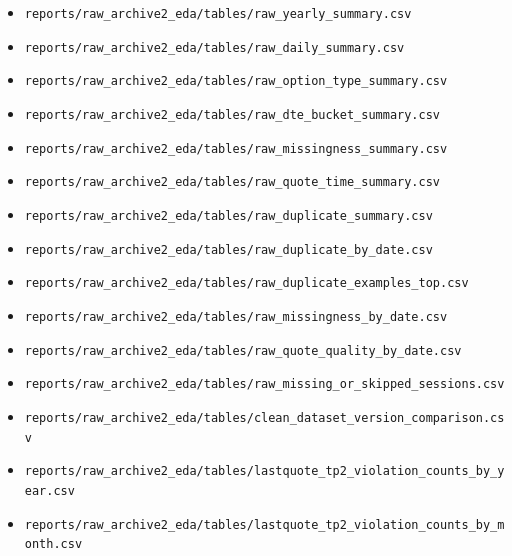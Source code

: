 \documentclass[11pt]{article}
\begin{document}
\begin{itemize}
  \item \texttt{reports/raw\_archive2\_eda/tables/raw\_yearly\_summary.csv}
  \item \texttt{reports/raw\_archive2\_eda/tables/raw\_daily\_summary.csv}
  \item \texttt{reports/raw\_archive2\_eda/tables/raw\_option\_type\_summary.csv}
  \item \texttt{reports/raw\_archive2\_eda/tables/raw\_dte\_bucket\_summary.csv}
  \item \texttt{reports/raw\_archive2\_eda/tables/raw\_missingness\_summary.csv}
  \item \texttt{reports/raw\_archive2\_eda/tables/raw\_quote\_time\_summary.csv}
  \item \texttt{reports/raw\_archive2\_eda/tables/raw\_duplicate\_summary.csv}
  \item \texttt{reports/raw\_archive2\_eda/tables/raw\_duplicate\_by\_date.csv}
  \item \texttt{reports/raw\_archive2\_eda/tables/raw\_duplicate\_examples\_top.csv}
  \item \texttt{reports/raw\_archive2\_eda/tables/raw\_missingness\_by\_date.csv}
  \item \texttt{reports/raw\_archive2\_eda/tables/raw\_quote\_quality\_by\_date.csv}
  \item \texttt{reports/raw\_archive2\_eda/tables/raw\_missing\_or\_skipped\_sessions.csv}
  \item \texttt{reports/raw\_archive2\_eda/tables/clean\_dataset\_version\_comparison.csv}
  \item \texttt{reports/raw\_archive2\_eda/tables/lastquote\_tp2\_violation\_counts\_by\_year.csv}
  \item \texttt{reports/raw\_archive2\_eda/tables/lastquote\_tp2\_violation\_counts\_by\_month.csv}
\end{itemize}
\end{document}
